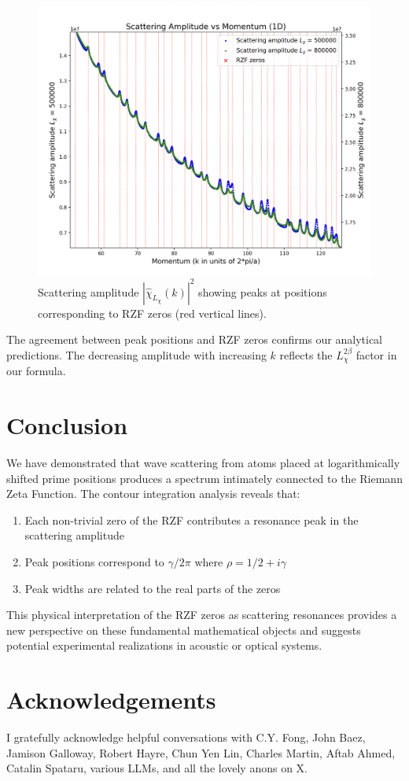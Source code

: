 \documentclass[11pt, oneside]{article}
\begin{document}
\begin{figure}[htbp]
\begin{center}
    \includegraphics[width=0.8\linewidth]{zoomed_scattering.png}
\caption{Scattering amplitude $|\hat{\chi}_{L_\chi}(k)|^2$ showing peaks at positions corresponding to RZF zeros (red vertical lines).}
\label{fig:scattering_amplitude}
\end{center}
\end{figure}

The agreement between peak positions and RZF zeros confirms our analytical predictions. The decreasing amplitude with increasing $k$ reflects the $L_\chi^{2\beta}$ factor in our formula.

\section{Conclusion}

We have demonstrated that wave scattering from atoms placed at logarithmically shifted prime positions produces a spectrum intimately connected to the Riemann Zeta Function. The contour integration analysis reveals that:

\begin{enumerate}
\item Each non-trivial zero of the RZF contributes a resonance peak in the scattering amplitude
\item Peak positions correspond to $\gamma/2\pi$ where $\rho = 1/2 + i\gamma$ 
\item Peak widths are related to the real parts of the zeros
\end{enumerate}

This physical interpretation of the RZF zeros as scattering resonances provides a new perspective on these fundamental mathematical objects and suggests potential experimental realizations in acoustic or optical systems.

\section{Acknowledgements}
I gratefully acknowledge helpful conversations with C.Y. Fong, John Baez, Jamison Galloway, Robert Hayre, Chun Yen Lin, Charles Martin, Aftab Ahmed, Catalin Spataru, various LLMs, and all the lovely anons on X.

\printbibliography
\end{document}
